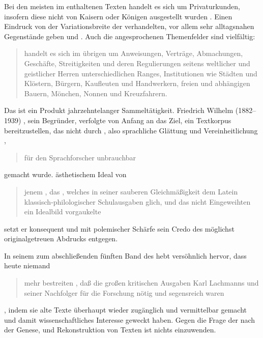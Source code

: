 %
Bei den meisten im \CAO{} enthaltenen Texten handelt es sich um
Privaturkunden, insofern diese nicht von Kaisern oder Königen
ausgestellt wurden \autocites[vgl.][575]{frenz1998a}[585]{frenz1998b}. Einen
Eindruck von der Variationsbreite der verhandelten, vor allem sehr alltagsnahen
Gegen\-stände geben \citet[11]{schulze2011} und \citet[35--36]{ganslmayer2012}.
Auch die angesprochenen Themenfelder sind vielfältig:
\blockcquote[596]{schmidtwiegand1998b}{ handelt es sich im übrigen
um Anweisungen, Verträge, Abmachungen, Geschäfte, Streitigkeiten und deren
Regulierungen seitens weltlicher und geistlicher Herren unterschiedlichen
Ranges, Institutionen wie Städten und Klöstern, Bürgern, Kaufleuten und
Handwerkern, freien und abhängigen Bauern, Mönchen, Nonnen und Kreuzfahrern.}

\begin{sloppypar}
Das \CAO{} ist ein Produkt jahrzehntelanger Sammeltätigkeit. Friedrich
Wilhelm\nocite{wilhelm1932} (1882--1939)%
, sein Begründer, verfolgte von Anfang an das Ziel, ein Textkorpus
bereitzustellen, das nicht durch , also
sprachliche Glättung und Vereinheitlichung
\autocites[vgl.][76--84]{bein2011}{kragl2015},
\blockcquote[\RN{60}]{wilhelm1932}{für den Sprachforscher unbrauchbar} gemacht
wurde.  ästhetischem Ideal von
\blockcquote[\RN{3}]{wilhelm1932}{jenem , das
 \textelp{}, welches in seiner
sauberen Gleichmäßigkeit dem Latein klassisch-philo\-logi\-scher Schulausgaben
glich, und das \textelp{} nicht Eingeweihten ein Idealbild vorgaukelte} setzt
er konsequent und mit polemischer Schärfe sein Credo des möglichst
originalgetreuen Abdrucks entgegen.
\end{sloppypar}

In seinem  zum abschließenden fünften Band des
\CAO{} hebt \citet[\RN{13}]{deboor1976} versöhnlich hervor, dass heute
niemand \blockquote{mehr bestreiten , daß
die großen kritischen Ausgaben Karl Lachmanns und seiner
Nachfolger für die Forschung nötig und segensreich waren}, indem sie alte Texte
überhaupt wieder zugänglich und vermittelbar gemacht und damit
wissenschaftliches Interesse geweckt haben. Gegen die Frage der
 nach der Genese,  und
Rekonstruktion von Texten ist nichts einzuwenden.

